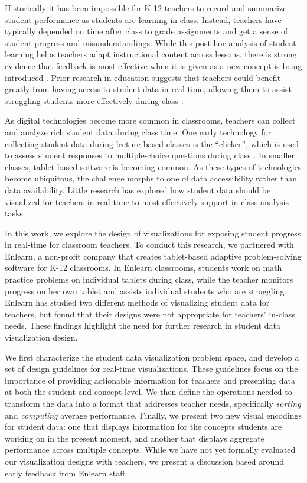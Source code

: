 \documentclass{sigchi}
\begin{document}
Historically it has been impossible for K-12 teachers to record and summarize student performance as students are learning in class. Instead, teachers have typically depended on time after class to grade assignments and get a sense of student progress and misunderstandings. While this post-hoc analysis of student learning helps teachers adapt instructional content across lessons, there is strong evidence that feedback is most effective when it is given as a new concept is being introduced \cite{Gibbs04, Steadman98}. Prior research in education suggests that teachers could benefit greatly from having access to student data in real-time, allowing them to assist struggling students more effectively during class \cite{Balaam2010, Koile2006, Lazar2007}.

As digital technologies become more common in classrooms, teachers can collect and analyze rich student data during class time. One early technology for collecting student data during lecture-based classes is the ``clicker'', which is used to assess student responses to multiple-choice questions during class \cite{Dangel08, Lazar2007}. In smaller classes, tablet-based software is becoming common. As these types of technologies become ubiquitous, the challenge morphs to one of data accessibility rather than data availability. Little research has explored how student data should be visualized for teachers in real-time to most effectively support in-class analysis tasks.

In this work, we explore the design of visualizations for exposing student progress in real-time for classroom teachers. To conduct this research, we partnered with Enlearn, a non-profit company that creates tablet-based adaptive problem-solving software for K-12 classrooms. In Enlearn classrooms, students work on math practice problems on individual tablets during class, while the teacher monitors progress on her own tablet and assists individual students who are struggling. Enlearn has studied two different methods of visualizing student data for teachers, but found that their designs were not appropriate for teachers' in-class needs. These findings highlight the need for further research in student data visualization design.

We first characterize the student data visualization problem space, and develop a set of design guidelines for real-time visualizations. These guidelines focus on the importance of providing actionable information for teachers and presenting data at both the student and concept level. We then define the operations needed to transform the data into a format that addresses teacher needs, specifically \emph{sorting} and \emph{computing} average performance. Finally, we present two new visual encodings for student data: one that displays information for the concepts students are working on in the present moment, and another that displays aggregate performance across multiple concepts. While we have not yet formally evaluated our visualization designs with teachers, we present a discussion based around early feedback from Enlearn staff.
\end{document}
